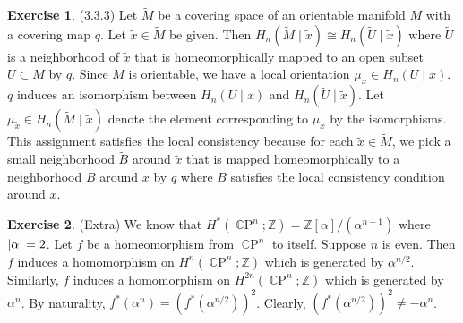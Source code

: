 \documentclass[12pt, psamsfonts]{amsart}
\theoremstyle{definition}
\newtheorem*{exer}{Exercise}
\theoremstyle{remark}
\DeclareMathOperator{\CP}{\mathbb{C}P}
\numberwithin{equation}{section}
\begin{document}
\begin{exer}{(3.3.3)}
  Let $\tilde{M}$ be a covering space of an orientable manifold $M$ with a covering map $q$.
  Let $\tilde{x} \in \tilde{M}$ be given.
  Then $H_n(\tilde{M} \mid \tilde{x}) \cong H_n(\tilde{U} \mid \tilde{x})$ where $\tilde{U}$ is a neighborhood of $\tilde{x}$ that is homeomorphically mapped to an open subset $U \subset M$ by $q$.
  Since $M$ is orientable, we have a local orientation $\mu_x \in H_n(U \mid x)$.
  $q$ induces an isomorphism between $H_n(U \mid x)$ and $H_n(\tilde{U} \mid \tilde{x})$.
  Let $\mu_{\tilde{x}} \in H_n(\tilde{M} \mid \tilde{x})$ denote the element corresponding to $\mu_x$ by the isomorphisms.
  This assignment satisfies the local consistency because for each $\tilde{x} \in \tilde{M}$, we pick a small neighborhood $\tilde{B}$ around $\tilde{x}$ that is mapped homeomorphically to a neighborhood $B$ around $x$ by $q$ where $B$ satisfies the local consistency condition around $x$.
\end{exer}

\begin{exer}{(Extra)}
  We know that $H^{\ast}(\CP^n; \mathbb{Z}) = \mathbb{Z}[\alpha] / (\alpha^{n + 1})$ where $\abs{\alpha} = 2$.
  Let $f$ be a homeomorphism from $\CP^n$ to itself.
  Suppose $n$ is even.
  Then $f$ induces a homomorphism on $H^n(\CP^n; \mathbb{Z})$ which is generated by $\alpha^{n / 2}$.
  Similarly, $f$ induces a homomorphism on $H^{2n}(\CP^n; \mathbb{Z})$ which is generated by $\alpha^{n}$.
  By naturality, $f^{\ast}(\alpha^n) = (f^{\ast}(\alpha^{n / 2}))^2$.
  Clearly, $(f^{\ast}(\alpha^{n / 2}))^2 \ne -\alpha^n$.
\end{exer}
\end{document}
